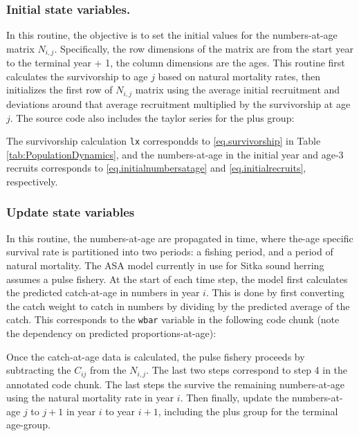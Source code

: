 \documentclass[12pt,letterpaper]{article}
\begin{document}
  \subsubsection{Initial state variables.} %
    \label{ssub:initial_state_variables_}
    
    In this routine, the objective is to set the initial values for the numbers-at-age matrix $N_{i,j}$.  Specifically, the row dimensions of the matrix are from the start year to the terminal year + 1, the column dimensions are the ages.  This routine first calculates the survivorship to age $j$ based on natural mortality rates, then initializes the first row of $N_{i,j}$ matrix using the average initial recruitment and deviations around that average recruitment multiplied by the survivorship at age $j$.  The source code also includes the taylor series for the plus group:
    

    The survivorship calculation \texttt{lx} correspondds to \eqref{eq.survivorship} in Table \ref{tab:PopulationDynamics}, and the numbers-at-age in the initial year and age-3 recruits corresponds to \eqref{eq.initialnumbersatage} and \eqref{eq.initialrecruits}, respectively.

    \subsubsection{Update state variables} %
    \label{ssub:update_state_variables}
    In this routine, the numbers-at-age are propagated in time, where the-age specific survival rate is partitioned into two periods: a fishing period, and a period of natural mortality.  The ASA model currently in use for Sitka sound herring assumes a pulse fishery.  At the start of each time step, the model first calculates the predicted catch-at-age in numbers in year $i$. This is done by first converting the catch weight to catch in numbers by dividing by the predicted average of the catch.  This corresponds to the \texttt{wbar} variable in the following code chunk (note the dependency on predicted proportions-at-age):
    
    Once the catch-at-age data is calculated, the pulse fishery proceeds by subtracting the $C_{ij}$  from the $N_{i,j}$.  The last two steps correspond to step 4 in the annotated code chunk. The last steps the survive the remaining numbers-at-age using the natural mortality rate in year $i$. Then finally, update the numbers-at-age $j$ to $j+1$ in year $i$ to year $i+1$, including the plus group for the terminal age-group.
\end{document}
